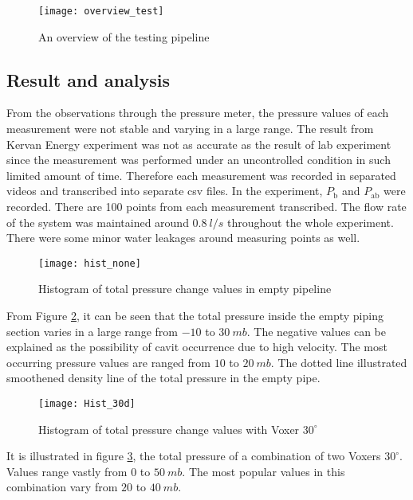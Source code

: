 \begin{figure}[h]
  \centering
  \texttt{[image: overview\_test]}
  \caption{ An overview of the testing pipeline}
  \label{fig:overview}
\end{figure}

\subsection{Result and analysis}

From the observations through the pressure meter, the pressure values of each measurement were not stable and varying in a large range. The result from Kervan Energy experiment was not as accurate as the result of lab experiment since the measurement was performed under an uncontrolled condition in such limited amount of time. Therefore each measurement was recorded in separated videos and transcribed into separate \gls{csv} files. In the experiment, $P_{\text{b}}$ and $P_{\text{ab}}$ were recorded. There are 100 points from each measurement transcribed. The flow rate of the system was maintained around $0.8\ l/s$ throughout the whole experiment. There were some minor water leakages around measuring points as well.
\newpage

\begin{figure}[h]
  \centering
  \texttt{[image: hist\_none]}
  \caption{ Histogram of total pressure change values in empty pipeline}
  \label{fig:histnone}
\end{figure}

From Figure \ref{fig:histnone}, it can be seen that the total pressure inside the empty piping section varies in a large range from $-10$ to $30\ mb$. The negative values can be explained as the possibility of \gls{cavit} occurrence due to high velocity. The most occurring pressure values are ranged from $10$ to $20\ mb$. The dotted line illustrated smoothened density line of the total pressure in the empty pipe. 

\begin{figure}[h]
  \centering
  \texttt{[image: Hist\_30d]}
  \caption{ Histogram of total pressure change values with Voxer $30^{\circ}$}
  \label{fig:hist30d}
\end{figure}

It is illustrated in figure \ref{fig:hist30d}, the total pressure of a combination of two Voxers $30^{\circ}$. Values range vastly from $0$ to $50\ mb$. The most popular values in this combination vary from $20$ to $40\ mb$.

